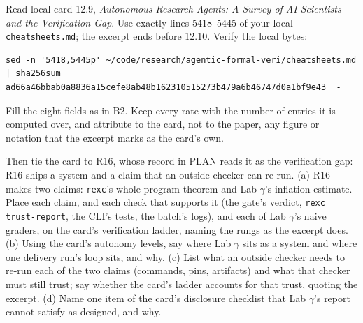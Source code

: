 \documentclass[11pt]{article}
\begin{document}
\begin{problem}\label{prob:B3}
Read local card 12.9, \emph{Autonomous Research Agents: A Survey of AI
Scientists and the Verification Gap}. Use exactly lines 5418--5445 of your
local \texttt{cheatsheets.md}; the excerpt ends before 12.10. Verify the local
bytes:
\begin{verbatim}
sed -n '5418,5445p' ~/code/research/agentic-formal-veri/cheatsheets.md | sha256sum
ad66a46bbab0a8836a15cefe8ab48b162310515273b479a6b46747d0a1bf9e43  -
\end{verbatim}
Fill the eight fields as in B2. Keep every rate with the number of entries it
is computed over, and attribute to the card, not to the paper, any figure or
notation that the excerpt marks as the card's own.

Then tie the card to R16, whose record in PLAN reads it as the verification
gap: R16 ships a system and a claim that an outside checker can re-run.
(a) R16 makes two claims: \texttt{rexc}'s whole-program theorem and Lab
$\gamma$'s inflation estimate. Place each claim, and each check that supports
it (the gate's verdict, \texttt{rexc trust-report}, the CLI's tests, the
batch's logs), and each of Lab $\gamma$'s naive graders, on the card's
verification ladder, naming the rungs as the excerpt does. (b) Using the
card's autonomy levels, say where Lab $\gamma$ sits as a system and where one
delivery run's loop sits, and why. (c) List what an outside checker needs to
re-run each of the two claims (commands, pins, artifacts) and what that
checker must still trust; say whether the card's ladder accounts for that
trust, quoting the excerpt. (d) Name one item of the card's disclosure
checklist that Lab $\gamma$'s report cannot satisfy as designed, and why.
\end{problem}
\end{document}
